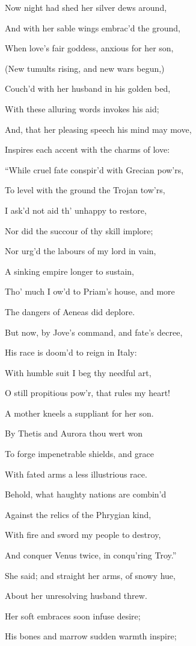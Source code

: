 Now night had shed her silver dews around,

And with her sable wings embrac’d the ground,

When love’s fair goddess, anxious for her son,

(New tumults rising, and new wars begun,)

Couch’d with her husband in his golden bed,

With these alluring words invokes his aid;

And, that her pleasing speech his mind may move,

Inspires each accent with the charms of love:

“While cruel fate conspir’d with Grecian pow’rs,

To level with the ground the Trojan tow’rs,

I ask’d not aid th’ unhappy to restore,

Nor did the succour of thy skill implore;

Nor urg’d the labours of my lord in vain,

A sinking empire longer to sustain,

Tho’ much I ow’d to Priam’s house, and more

The dangers of Aeneas did deplore.

But now, by Jove’s command, and fate’s decree,

His race is doom’d to reign in Italy:

With humble suit I beg thy needful art,

O still propitious pow’r, that rules my heart!

A mother kneels a suppliant for her son.

By Thetis and Aurora thou wert won

To forge impenetrable shields, and grace

With fated arms a less illustrious race.

Behold, what haughty nations are combin’d

Against the relics of the Phrygian kind,

With fire and sword my people to destroy,

And conquer Venus twice, in conqu’ring Troy.”

She said; and straight her arms, of snowy hue,

About her unresolving husband threw.

Her soft embraces soon infuse desire;

His bones and marrow sudden warmth inspire;


